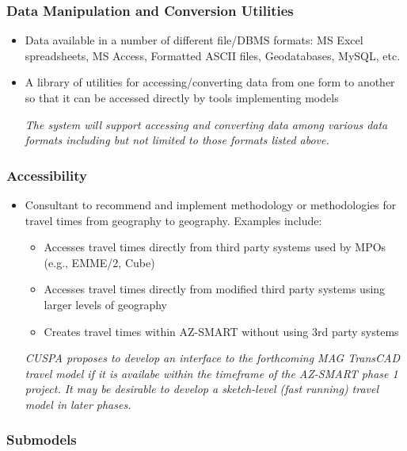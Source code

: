\subsubsection{Data Manipulation and Conversion Utilities}

\begin{itemize}

\item Data available in a number of different file/DBMS formats: MS Excel spreadsheets, MS Access, Formatted ASCII files, Geodatabases, MySQL, etc.
\item A library of utilities for accessing/converting data from one form to another so that it can be accessed directly by tools implementing models

\emph{The system will support accessing and converting data among various data formats including but not limited to those formats listed above.}

\end{itemize}

\subsubsection{Accessibility}

\begin{itemize}

\item Consultant to recommend and implement methodology or methodologies for travel times from geography to geography. Examples include:
\begin{itemize}
\item Accesses travel times directly from third party systems used by MPOs (e.g., EMME/2, Cube)
\item Accesses travel times directly from modified third party systems using larger levels of geography
\item Creates travel times within AZ-SMART without using 3rd party systems
\end{itemize}

\emph{CUSPA proposes to develop an interface to the forthcoming MAG TransCAD travel model if it is availabe within the timeframe of the AZ-SMART phase 1 project.  It may be desirable to develop a sketch-level (fast running) travel model in later phases.}

\end{itemize}

\subsubsection{Submodels}

